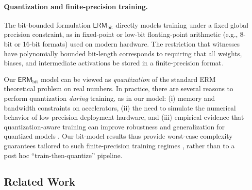 \documentclass{article}
\theoremstyle{plain}
\theoremstyle{definition}
\theoremstyle{remark}
\begin{document}
\paragraph{Quantization and finite-precision training.}
The bit-bounded formulation $\mathsf{ERM}_{\text{bit}}$ directly models
training under a fixed global precision constraint, as in fixed-point or
low-bit floating-point arithmetic (e.g., 8-bit or 16-bit formats) used on
modern hardware. The restriction that witnesses have polynomially bounded
bit-length corresponds to requiring that all weights, biases, and
intermediate activations be stored in a finite-precision format. 



 Our $\mathsf{ERM}_{\text{bit}}$ model can be viewed as {\em quantization}  of the standard ERM theoretical problem on real numbers. In practice, there are several reasons to perform quantization \emph{during} 
training, as in our model: (i) memory and bandwidth
constraints on accelerators, (ii) the need to simulate the numerical behavior
of low-precision deployment hardware, and (iii) empirical evidence that
quantization-aware training can improve robustness and generalization for
quantized models \cite{courbariaux2015binaryconnect,rastegari2016xnor,
	polino2018model,rokh2023comprehensive}. Our bit-model results thus provide
worst-case complexity guarantees tailored to such finite-precision training
regimes \cite{tailor2020degree,zhou2018adaptive,nagel2022overcoming,sakr2022optimal,liu2023llm}, rather than to a post hoc ``train-then-quantize'' pipeline.



\subsection{Related Work}
\end{document}
